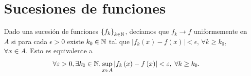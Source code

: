 \section{Sucesiones de funciones}
\begin{notation}
	Dado una sucesión de funciones $\displaystyle \left\{ f_{k}\right\} _{k \in \mathbb{N}} $, decíamos que $\displaystyle f_{k}\to f $ uniformemente en $\displaystyle A $ si para cada $\displaystyle \epsilon >0 $ existe $\displaystyle k_{0} \in \mathbb{N} $ tal que $\displaystyle \left|f_{k}\left(x\right)-f\left(x\right)\right|<\epsilon  $, $\displaystyle \forall k \geq k_{0} $, $\displaystyle \forall x \in A $. Esto es equivalente a 
	\[\forall \varepsilon > 0, \exists k_{0}\in \mathbb{N}, \sup_{x\in A} \left|f_{k}\left(x\right)-f\left(x\right)\right|<\varepsilon, \; \forall k \geq k_{0} .\]
\end{notation}

